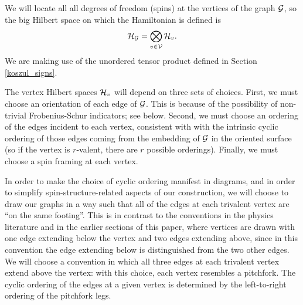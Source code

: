 We will locate all all degrees of freedom (spins) at the vertices of the graph $\mathcal{G}$, so
the big Hilbert space on which the Hamiltonian is defined is
\begin{align}	\label{GraphHilbertSpace}
 \mch_\mcg =\bigotimes_{v \in \mcv} \mch_v.  %
\end{align}
We are making use of the unordered tensor product defined in Section \ref{koszul_signs}.

The vertex Hilbert spaces $\mathcal{H}_{v}$ will depend on three sets of choices.
First, we must choose an orientation of each edge of $\mathcal{G}$.
This is because of the possibility of non-trivial Frobenius-Schur indicators; see below.
Second, we must choose an ordering of the edges incident to each vertex, consistent with with the intrinsic cyclic ordering of those edges
coming from the embedding of $\mathcal{G}$ in the oriented surface
(so if the vertex is $r$-valent, there are $r$ possible orderings).
Finally, we must choose a spin framing at each vertex.

In order to make the choice of cyclic ordering manifest in diagrams, and in order to simplify spin-structure-related
aspects of our construction, we will choose to draw our graphs in a way such that all of the 
edges at each trivalent vertex are ``on the same footing''. This is in contrast to the conventions in the physics literature
and in the earlier sections of this paper, where vertices are drawn with one edge extending below the vertex and two 
edges extending above, since in this convention the edge extending below is distinguished from the two other edges.
We will choose a convention in which all three edges at each trivalent vertex extend above the vertex: with this
choice, each vertex resembles a pitchfork. 
The cyclic ordering of the edges at a given vertex is determined by the left-to-right ordering of the pitchfork legs. 

